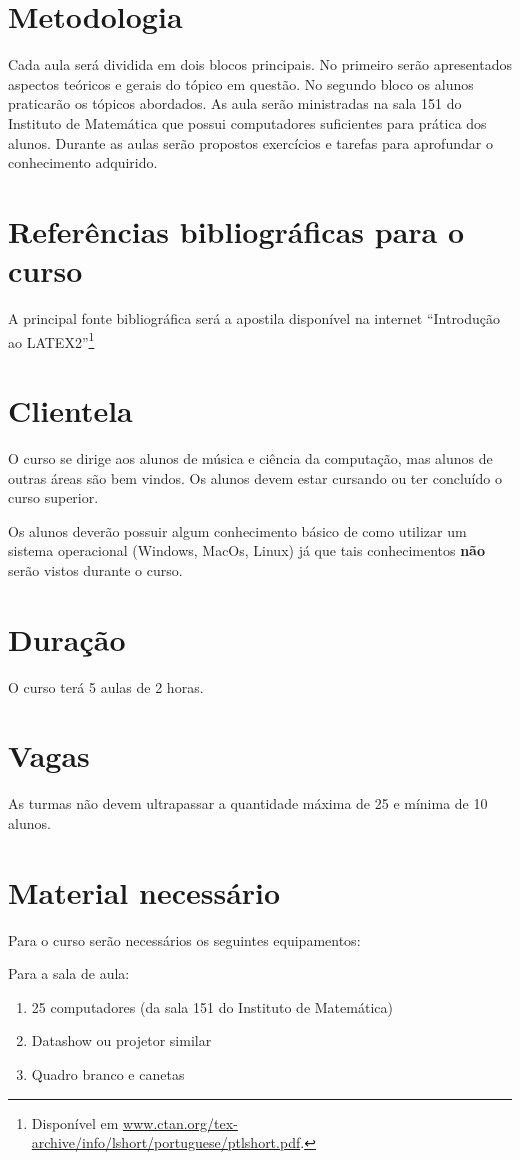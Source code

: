 \documentclass[12pt,brazil]{article}
\begin{document}
\section{Metodologia}

Cada aula será dividida em dois blocos principais. No primeiro serão
apresentados aspectos teóricos e gerais do tópico em questão. No
segundo bloco os alunos praticarão os tópicos abordados. As aula serão
ministradas na sala 151 do Instituto de Matemática que possui
computadores suficientes para prática dos alunos. Durante as aulas
serão propostos exercícios e tarefas para aprofundar o conhecimento
adquirido.

\section{Referências bibliográficas para o curso}

A principal fonte bibliográfica será a apostila disponível na internet
``Introdução ao LATEX2''\footnote{Disponível em
  \url{www.ctan.org/tex-archive/info/lshort/portuguese/ptlshort.pdf}.}


\section{Clientela}
O curso se dirige aos alunos de música e ciência da computação, mas
alunos de outras áreas são bem vindos. Os alunos devem estar cursando
ou ter concluído o curso superior.
  
Os alunos deverão possuir algum conhecimento básico de como utilizar
um sistema operacional (Windows, MacOs, Linux) já que tais
conhecimentos \textbf{não} serão vistos durante o curso.

\section{Duração}

O curso terá 5 aulas de 2 horas.
 
\section{Vagas}

As turmas não devem ultrapassar a quantidade máxima de 25 e mínima de
10 alunos.

\section{Material necessário}
\label{sec:material}

Para o curso serão necessários os seguintes equipamentos:

Para a sala de aula:
\begin{enumerate}
\item 25 computadores (da sala 151 do Instituto de Matemática)
\item Datashow ou projetor similar
\item Quadro branco e canetas
\end{enumerate}
\end{document}

